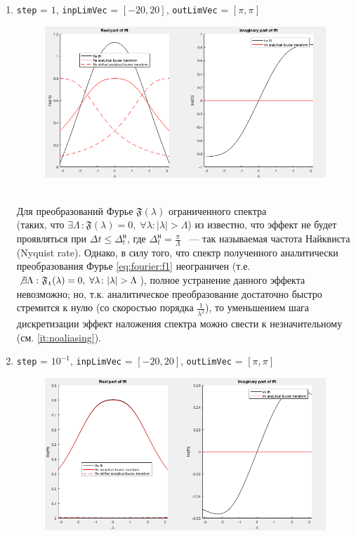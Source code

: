 \documentclass[11pt, oneside, draft]{article}
\numberwithin{equation}{section}
\newcounter{icount}
\newcommand \four[1][\lambda]{\mathfrak{F}(#1)}
\begin{document}
    \begin{enumerate}
        \setcounter{enumi}{\value{icount}}
        \item 
        \texttt{step} = \(1\), \texttt{inpLimVec} = \( [-20, 20] \), \texttt{outLimVec} = \( [\pi, \pi] \)
        \begin{figure}[!h]
            \centering
            \includegraphics[width=\linewidth]{f1fig4}
            \label{pic:f1:4}
        \end{figure} \\
        Для преобразований Фурье \( \four \) ограниченного спектра \\ (таких, что \( \exists\Lambda \, \colon \four =0, \; \forall \lambda \colon |\lambda| > \Lambda \))
        из \cite{Roublev:fourier} известно, что эффект не будет проявляться при \(\Delta t \leqslant \Delta_{t}^\text{н}\),
        где \(\Delta_{t}^\text{н} = \frac{\pi}{\Lambda}\) ~--- так называемая частота Найквиста (Nyquist rate).
        Однако, в силу того, что спектр полученного аналитически преобразования Фурье \eqref{eq:fourier:f1} 
        неограничен (т.е. \(\not\exists\Lambda \, \colon \mathfrak{F_1}(\lambda) = 0, \; \forall \lambda \colon |\lambda| > \Lambda\)),
        полное устранение данного эффекта невозможно;
        но, т.к. аналитическое преобразование достаточно быстро стремится к нулю (со скоростью порядка \(\frac{1}{\lambda^2}\)), 
        то уменьшением шага дискретизации эффект наложения спектра можно свести к незначительному (см. \ref{it:noaliasing}).
        \clearpage
        \item
        \label{it:noaliasing}
        \texttt{step} = \(10^{-1}\), \texttt{inpLimVec} = \( [-20, 20] \), \texttt{outLimVec} = \( [\pi, \pi] \)
        \begin{figure}[!h]
            \centering
            \includegraphics[width=\linewidth]{f1fig5}

\end{figure}
\end{enumerate}
\end{document}
